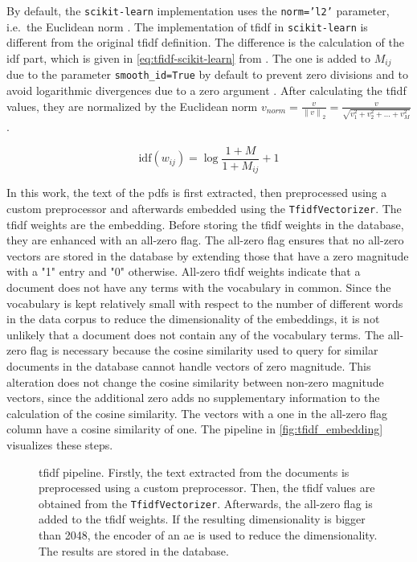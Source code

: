 By default, the \texttt{scikit-learn} implementation uses the \texttt{norm='l2'} parameter, i.e.\ the Euclidean norm \cite{tfidf-scikit-learn}.
The implementation of \ac{tfidf} in \texttt{scikit-learn} is different from the original \ac{tfidf} definition.
The difference is the calculation of the \ac{idf} part, which is given in \autoref{eq:tfidf-scikit-learn} from \cite{tfidf-scikit-learn}.
The one is added to $M_{ij}$ due to the parameter \texttt{smooth\_id=True} by default to prevent zero divisions \cite{tfidf-scikit-learn}
and to avoid logarithmic divergences due to a zero argument \cite{glove2014}.
After calculating the \ac{tfidf} values, they are normalized by the Euclidean norm 
$v_{norm} = \frac{v}{\left\| v \right\|_{2}} = \frac{v}{\sqrt{v_1^{2} + v_2^{2} + ... + v_M^{2}}}$.

\begin{equation}
    \text{idf}(w_{ij}) = \log \frac{1 + M}{1 + M_{ij}} + 1    
    \label{eq:tfidf-scikit-learn}
\end{equation}

In this work, the text of the \acp{pdf} is first extracted, then preprocessed using a custom preprocessor and afterwards embedded using the \texttt{TfidfVectorizer}.
The \ac{tfidf} weights are the embedding.
Before storing the \ac{tfidf} weights in the database, they are enhanced with an all-zero flag.
The all-zero flag ensures that no all-zero vectors are stored in the database by extending those that have a zero magnitude with a "1" entry and "0" otherwise.
All-zero \ac{tfidf} weights indicate that a document does not have any terms with the vocabulary in common.
Since the vocabulary is kept relatively small with respect to the number of different words in the data corpus to reduce the dimensionality of the embeddings, 
it is not unlikely that a document does not contain any of the vocabulary terms.
The all-zero flag is necessary because the cosine similarity used to query for similar documents in the database cannot handle vectors of zero magnitude.
This alteration does not change the cosine similarity between non-zero magnitude vectors, 
since the additional zero adds no supplementary information to the calculation of the cosine similarity.
The vectors with a one in the all-zero flag column have a cosine similarity of one.
The pipeline in \autoref{fig:tfidf_embedding} visualizes these steps.

\begin{figure}[!htb] %
    \centering
    
    \caption[\ac{tfidf} pipeline]{\ac{tfidf} pipeline.
    Firstly, the text extracted from the documents is preprocessed using a custom preprocessor.
    Then, the \ac{tfidf} values are obtained from the \texttt{TfidfVectorizer}.
    Afterwards, the all-zero flag is added to the \ac{tfidf} weights.
    If the resulting dimensionality is bigger than 2048, the encoder of an \ac{ae} is used to reduce the dimensionality.
    The results are stored in the database.
    }
    \label{fig:tfidf_embedding}
\end{figure}

